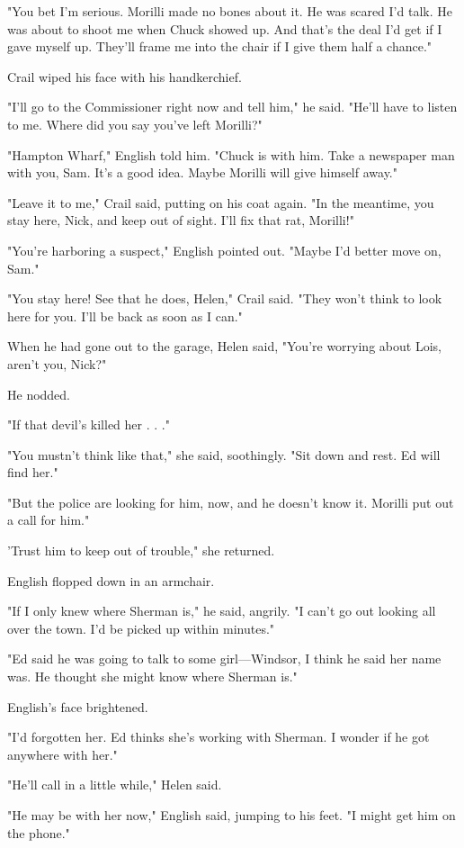 \documentclass{novel}
\begin{document}
"You bet I'm serious. Morilli made no bones about it. He was scared I'd talk. He was about to shoot me when Chuck showed up. And that's the deal I'd get if I gave myself up. They'll frame me into the chair if I give them half a chance."

Crail wiped his face with his handkerchief.

"I'll go to the Commissioner right now and tell him," he said. "He'll have to listen to me. Where did you say you've left Morilli?"

"Hampton Wharf," English told him. "Chuck is with him. Take a newspaper man with you, Sam. It's a good idea. Maybe Morilli will give himself away."

"Leave it to me," Crail said, putting on his coat again. "In the meantime, you stay here, Nick, and keep out of sight. I'll fix that rat, Morilli!"

"You're harboring a suspect," English pointed out. "Maybe I'd better move on, Sam."

"You stay here! See that he does, Helen," Crail said. "They won't think to look here for you. I'll be back as soon as I can."

When he had gone out to the garage, Helen said, "You're worrying about Lois, aren't you, Nick?"

He nodded.

"If that devil's killed her . . ."

"You mustn't think like that," she said, soothingly. "Sit down and rest. Ed will find her."

"But the police are looking for him, now, and he doesn't know it. Morilli put out a call for him."

'Trust him to keep out of trouble," she returned.

English flopped down in an armchair.

"If I only knew where Sherman is," he said, angrily. "I can't go out looking all over the town. I'd be picked up within minutes."

"Ed said he was going to talk to some girl—Windsor, I think he said her name was. He thought she might know where Sherman is."

English's face brightened.

"I'd forgotten her. Ed thinks she's working with Sherman. I wonder if he got anywhere with her."

"He'll call in a little while," Helen said.

"He may be with her now," English said, jumping to his feet. "I might get him on the phone."
\end{document}
